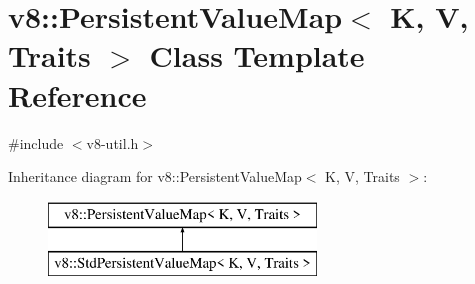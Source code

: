 \hypertarget{classv8_1_1_persistent_value_map}{}\section{v8\+:\+:Persistent\+Value\+Map$<$ K, V, Traits $>$ Class Template Reference}
\label{classv8_1_1_persistent_value_map}


{\ttfamily \#include $<$v8-\/util.\+h$>$}

Inheritance diagram for v8\+:\+:Persistent\+Value\+Map$<$ K, V, Traits $>$\+:\begin{figure}[H]
\begin{center}
\leavevmode
\includegraphics[height=2.000000cm]{classv8_1_1_persistent_value_map}
\end{center}
\end{figure}

